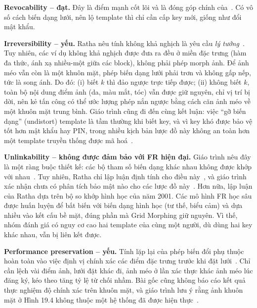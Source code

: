 \documentclass[12pt,a4paper]{article}
\begin{document}
\textbf{Revocability – đạt.} Đây là điểm mạnh cốt lõi và là đóng góp chính của~\cite{ratha2001}. Có vô số cách biến dạng lưới, nên lộ template thì chỉ cần cấp key mới, giống như đổi mật khẩu.

\textbf{Irreversibility – yếu.} Ratha nêu tính không khả nghịch là yêu cầu \emph{lý tưởng}~\cite[p.~629]{ratha2001}. Tuy nhiên, các ví dụ không khả nghịch được đưa ra đều ở miền đặc trưng (hàm đa thức, ánh xạ nhiều-một giữa các block), không phải phép morph ảnh. Để ảnh méo vẫn còn là một khuôn mặt, phép biến dạng lưới phải trơn và không gấp nếp, tức là song ánh. Do đó: (i) biết $k$ thì đảo ngược trực tiếp được; (ii) không biết $k$, toàn bộ nội dung điểm ảnh (da, màu mắt, tóc) vẫn được giữ nguyên, chỉ vị trí bị dời, nên kẻ tấn công có thể ước lượng phép nắn ngược bằng cách căn ảnh méo về một khuôn mặt trung bình. Giáo trình cũng đi đến cùng kết luận: việc ``gỡ biến dạng'' (undistort) template là tầm thường khi biết key, và vì key khó được bảo vệ tốt hơn mật khẩu hay PIN, trong nhiều kịch bản lược đồ này không an toàn hơn một template truyền thống được mã hoá~\cite[tr.~395]{adler2008}.

\textbf{Unlinkability – không được đảm bảo với FR hiện đại.} Giáo trình nêu đây là một ràng buộc thiết kế: các bộ tham số biến dạng khác nhau không được khớp với nhau~\cite[tr.~393]{adler2008}. Tuy nhiên, Ratha chỉ lập luận định tính cho điều này~\cite[p.~629]{ratha2001}, và giáo trình xác nhận chưa có phân tích bảo mật nào cho các lược đồ này~\cite[tr.~395]{adler2008}. Hơn nữa, lập luận của Ratha dựa trên bộ so khớp hình học của năm 2001. Các mô hình FR học sâu được huấn luyện để bất biến với biến dạng hình học (tư thế, biểu cảm) và dựa nhiều vào kết cấu bề mặt, đúng phần mà Grid Morphing giữ nguyên. Vì thế, nhóm đánh giá có nguy cơ cao hai template của cùng một người, dù dùng hai key khác nhau, vẫn bị liên kết được.

\textbf{Performance preservation – yếu.} Tính lặp lại của phép biến đổi phụ thuộc hoàn toàn vào việc định vị chính xác các điểm đặc trưng trước khi đặt lưới~\cite[p.~630]{ratha2001}. Chỉ cần lệch vài điểm ảnh, lưới đặt khác đi, ảnh méo ở lần xác thực khác ảnh méo lúc đăng ký, kéo theo tăng tỷ lệ từ chối nhầm. Bài gốc cũng không báo cáo kết quả thực nghiệm độ chính xác trên khuôn mặt, và giáo trình lưu ý rằng ảnh khuôn mặt ở Hình 19.4 không thuộc một hệ thống đã được hiện thực~\cite[tr.~394]{adler2008}.
\end{document}
